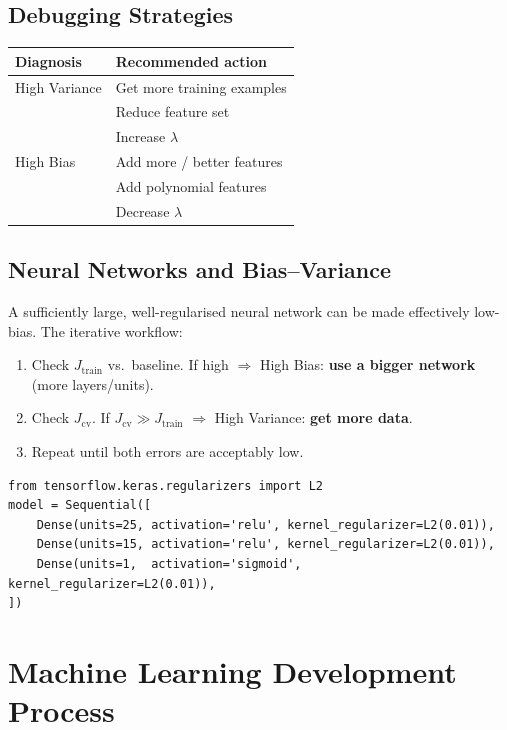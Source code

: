 \subsection{Debugging Strategies}

\begin{center}
\begin{tabular}{ll}
\toprule
\textbf{Diagnosis} & \textbf{Recommended action}\\
\midrule
High Variance & Get more training examples\\
              & Reduce feature set\\
              & Increase $\lambda$\\
\midrule
High Bias     & Add more / better features\\
              & Add polynomial features\\
              & Decrease $\lambda$\\
\bottomrule
\end{tabular}
\end{center}

\subsection{Neural Networks and Bias--Variance}

A sufficiently large, well-regularised neural network can be made effectively
low-bias. The iterative workflow:
\begin{enumerate}
\item Check $J_{\text{train}}$ vs.\ baseline. If high $\Rightarrow$ High Bias:
  \textbf{use a bigger network} (more layers/units).
\item Check $J_{\text{cv}}$. If $J_{\text{cv}}\gg J_{\text{train}}$
  $\Rightarrow$ High Variance: \textbf{get more data}.
\item Repeat until both errors are acceptably low.
\end{enumerate}

\begin{lstlisting}[caption={$L_2$ regularisation in Keras}]
from tensorflow.keras.regularizers import L2
model = Sequential([
    Dense(units=25, activation='relu', kernel_regularizer=L2(0.01)),
    Dense(units=15, activation='relu', kernel_regularizer=L2(0.01)),
    Dense(units=1,  activation='sigmoid', kernel_regularizer=L2(0.01)),
])
\end{lstlisting}

\section{Machine Learning Development Process}

